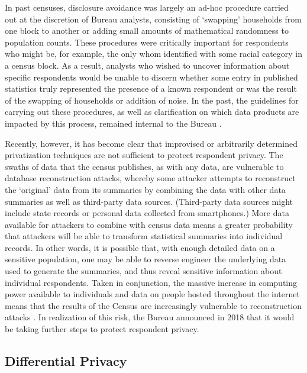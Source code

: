 In past censuses, disclosure avoidance was largely an ad-hoc procedure carried out at the discretion of Bureau analysts, consisting of `swapping' households from one block to another or adding small amounts of mathematical randomness to population counts. These procedures were critically important for respondents who might be, for example, the only whom identified with some racial category in a census block. As a result, analysts who wished to uncover information about specific respondents would be unable to discern whether some entry in published statistics truly represented the presence of a known respondent or was the result of the swapping of households or addition of noise. In the past, the guidelines for carrying out these procedures, as well as clarification on which data products are impacted by this process, remained internal to the Bureau \cite{boyd_balancing_2020}.

Recently, however, it has become clear that improvised or arbitrarily determined privatization techniques are not sufficient to protect respondent privacy. The swaths of data that the census publishes, as with any data, are vulnerable to database reconstruction attacks, whereby some attacker attempts to reconstruct the `original' data from its summaries by combining the data with other data summaries as well as third-party data sources. (Third-party data sources might include state records or personal data collected from smartphones.) More data available for attackers to combine with census data means a greater probability that attackers will be able to transform statistical summaries into individual records. In other words, it is possible that, with enough detailed data on a sensitive population, one may be able to reverse engineer the underlying data used to generate the summaries, and thus reveal sensitive information about individual respondents. Taken in conjunction, the massive increase in computing power available to individuals and data on people hosted throughout the internet means that the results of the Census are increasingly vulnerable to reconstruction attacks \cite{boyd_balancing_2020, abowd_economic_2019}. In realization of this risk, the Bureau announced in 2018 that it would be taking further steps to protect respondent privacy.

\subsection{Differential Privacy}\label{sec:dp}

